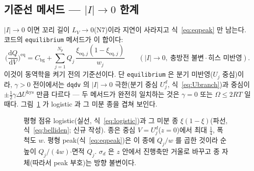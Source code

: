 \documentclass[11pt,a4paper]{article}
\newcommand{\dd}{\mathrm{d}}
\newcommand{\eq}{\mathrm{eq}}
\newcommand{\bg}{\mathrm{bg}}
\newcommand{\hys}{\mathrm{hys}}
\newcommand{\sgn}{\sigma_d}
\begin{document}
\subsection{기준선 메서드 — $|I|\to0$ 한계}
$|I|\to0$ 이면 꼬리 길이 $L_V\to0$(N7)이라 지연이 사라지고 식~\eqref{eq:eqpeak} 만 남는다. 코드의 \texttt{equilibrium} 메서드가 이 합이다:
\begin{equation}
\Big(\frac{\dd Q}{\dd V}\Big)^\eq=C_\bg+\sum_{j=1}^{N_p}Q_j\,\frac{\xi_{\eq,j}(1-\xi_{\eq,j})}{w_j}
\qquad(|I|\to0,\ \text{충방전 불변}\cdot\text{히스 미반영}).
\label{eq:equilibrium}
\end{equation}
이것이 동역학을 켜기 전의 기준선이다. 단 \texttt{equilibrium} 은 분기 미반영($U_j$ 중심)이라, $\gamma>0$ 전이에서는 \texttt{dqdv} 의 $|I|\to0$ 극한(분기 중심 $U_j^d$, 식~\eqref{eq:Ubranch})과 중심이 $\pm\tfrac12\gamma\Delta U^\hys$ 만큼 다르다 — 두 메서드가 완전히 일치하는 것은 $\gamma=0$ 또는 $\Omega\le2RT$ 일 때다. 그림~\ref{fig:bell} 가 logistic 과 그 미분 종을 겹쳐 보인다.

\begin{figure}[t]
\centering
{}
\caption{평형 점유 logistic(실선, 식~\eqref{eq:logistic})과 그 미분 종 $\xi(1-\xi)$(파선, 식~\eqref{eq:belliden}; 신규 작성). 종은 중심 $V=U_j^d$($z=0$)에서 최대 $\tfrac14$, 폭 척도 $w$. 평형 peak(식~\eqref{eq:eqpeak})은 이 종에 $Q_j/w$ 를 곱한 것이라 순높이 $Q_j/(4w)$$\cdot$면적 $Q_j$. $\sgn$ 은 $z$ 안에서 진행축만 거울로 바꾸고 종 자체(따라서 peak 부호)는 방향 불변이다.}
\label{fig:bell}
\end{figure}
\end{document}
